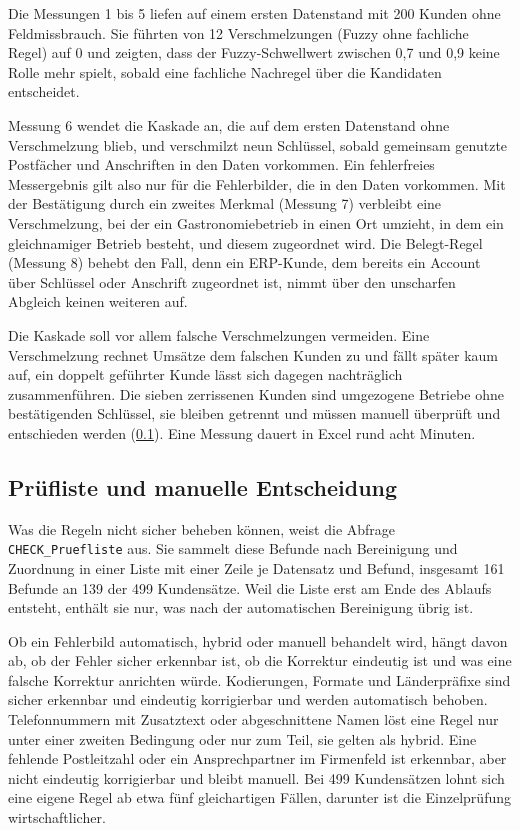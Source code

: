 \documentclass[a4paper,12pt]{article}
\newcommand{\pq}[1]{\texttt{#1}}        %
\begin{document}
Die Messungen 1 bis 5 liefen auf einem ersten Datenstand mit 200 Kunden ohne Feldmissbrauch. Sie führten von 12 Verschmelzungen (Fuzzy ohne fachliche Regel) auf 0 und zeigten, dass der Fuzzy-Schwellwert zwischen 0,7 und 0,9 keine Rolle mehr spielt, sobald eine fachliche Nachregel über die Kandidaten entscheidet.

Messung 6 wendet die Kaskade an, die auf dem ersten Datenstand ohne Verschmelzung blieb, und verschmilzt neun Schlüssel, sobald gemeinsam genutzte Postfächer und Anschriften in den Daten vorkommen. Ein fehlerfreies Messergebnis gilt also nur für die Fehlerbilder, die in den Daten vorkommen. Mit der Bestätigung durch ein zweites Merkmal (Messung 7) verbleibt eine Verschmelzung, bei der ein Gastronomiebetrieb in einen Ort umzieht, in dem ein gleichnamiger Betrieb besteht, und diesem zugeordnet wird. Die Belegt-Regel (Messung 8) behebt den Fall, denn ein ERP-Kunde, dem bereits ein Account über Schlüssel oder Anschrift zugeordnet ist, nimmt über den unscharfen Abgleich keinen weiteren auf.

Die Kaskade soll vor allem falsche Verschmelzungen vermeiden. Eine Verschmelzung rechnet Umsätze dem falschen Kunden zu und fällt später kaum auf, ein doppelt geführter Kunde lässt sich dagegen nachträglich zusammenführen. Die sieben zerrissenen Kunden sind umgezogene Betriebe ohne bestätigenden Schlüssel, sie bleiben getrennt und müssen manuell überprüft und entschieden werden (\cref{sec:pruefliste}). Eine Messung dauert in Excel rund acht Minuten.

\subsection{Prüfliste und manuelle Entscheidung}\label{sec:pruefliste}

Was die Regeln nicht sicher beheben können, weist die Abfrage \pq{CHECK\_Pruefliste} aus. Sie sammelt diese Befunde nach Bereinigung und Zuordnung in einer Liste mit einer Zeile je Datensatz und Befund, insgesamt 161 Befunde an 139 der 499 Kundensätze. Weil die Liste erst am Ende des Ablaufs entsteht, enthält sie nur, was nach der automatischen Bereinigung übrig ist.

Ob ein Fehlerbild automatisch, hybrid oder manuell behandelt wird, hängt davon ab, ob der Fehler sicher erkennbar ist, ob die Korrektur eindeutig ist und was eine falsche Korrektur anrichten würde. Kodierungen, Formate und Länderpräfixe sind sicher erkennbar und eindeutig korrigierbar und werden automatisch behoben. Telefonnummern mit Zusatztext oder abgeschnittene Namen löst eine Regel nur unter einer zweiten Bedingung oder nur zum Teil, sie gelten als hybrid. Eine fehlende Postleitzahl oder ein Ansprechpartner im Firmenfeld ist erkennbar, aber nicht eindeutig korrigierbar und bleibt manuell. Bei 499 Kundensätzen lohnt sich eine eigene Regel ab etwa fünf gleichartigen Fällen, darunter ist die Einzelprüfung wirtschaftlicher.
\end{document}
